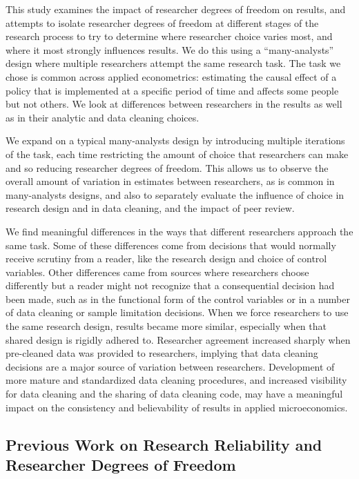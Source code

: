 \documentclass[
  letterpaper,
  DIV=11,
  numbers=noendperiod]{scrartcl}
\begin{document}
This study examines the impact of researcher degrees of freedom on
results, and attempts to isolate researcher degrees of freedom at
different stages of the research process to try to determine where
researcher choice varies most, and where it most strongly influences
results. We do this using a ``many-analysts'' design where multiple
researchers attempt the same research task. The task we chose is common
across applied econometrics: estimating the causal effect of a policy
that is implemented at a specific period of time and affects some people
but not others. We look at differences between researchers in the
results as well as in their analytic and data cleaning choices.

We expand on a typical many-analysts design by introducing multiple
iterations of the task, each time restricting the amount of choice that
researchers can make and so reducing researcher degrees of freedom. This
allows us to observe the overall amount of variation in estimates
between researchers, as is common in many-analysts designs, and also to
separately evaluate the influence of choice in research design and in
data cleaning, and the impact of peer review.

We find meaningful differences in the ways that different researchers
approach the same task. Some of these differences come from decisions
that would normally receive scrutiny from a reader, like the research
design and choice of control variables. Other differences came from
sources where researchers choose differently but a reader might not
recognize that a consequential decision had been made, such as in the
functional form of the control variables or in a number of data cleaning
or sample limitation decisions. When we force researchers to use the
same research design, results became more similar, especially when that
shared design is rigidly adhered to. Researcher agreement increased
sharply when pre-cleaned data was provided to researchers, implying that
data cleaning decisions are a major source of variation between
researchers. Development of more mature and standardized data cleaning
procedures, and increased visibility for data cleaning and the sharing
of data cleaning code, may have a meaningful impact on the consistency
and believability of results in applied microeconomics.

\subsection{Previous Work on Research Reliability and Researcher Degrees
of
Freedom}\label{previous-work-on-research-reliability-and-researcher-degrees-of-freedom}
\end{document}
